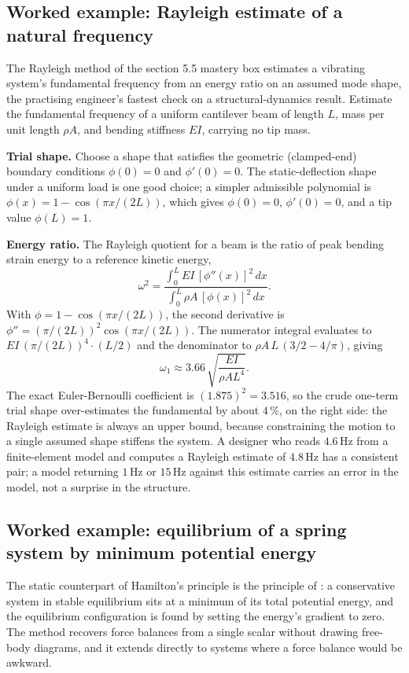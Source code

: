 \subsection{Worked example: Rayleigh estimate of a natural frequency}

The Rayleigh method of the section 5.5 mastery box estimates a vibrating
system's fundamental frequency from an energy ratio on an assumed mode
shape, the practising engineer's fastest check on a
structural-dynamics result. Estimate the
fundamental frequency of a uniform cantilever beam of length $L$, mass
per unit length $\rho A$, and bending stiffness $EI$, carrying no tip
mass.

\textbf{Trial shape.} Choose a shape that satisfies the geometric
(clamped-end) boundary conditions $\phi(0) = 0$ and $\phi'(0) = 0$. The
static-deflection shape under a uniform load is one good choice; a
simpler admissible polynomial is $\phi(x) = 1 - \cos(\pi x / (2L))$,
which gives $\phi(0) = 0$, $\phi'(0) = 0$, and a tip value $\phi(L) = 1$.

\textbf{Energy ratio.} The Rayleigh quotient for a beam is the ratio of
peak bending strain energy to a reference kinetic energy,
\[
\omega^2 = \frac{\displaystyle\int_0^L EI\,[\phi''(x)]^2\,dx}
                {\displaystyle\int_0^L \rho A\,[\phi(x)]^2\,dx}.
\]
With $\phi = 1 - \cos(\pi x/(2L))$, the second derivative is $\phi'' =
(\pi/(2L))^2\cos(\pi x/(2L))$. The numerator integral evaluates to
$EI\,(\pi/(2L))^4 \cdot (L/2)$ and the denominator to $\rho A\,L\,(3/2 -
4/\pi)$, giving
\[
\omega_1 \approx 3.66\,\sqrt{\frac{EI}{\rho A L^4}}.
\]
The exact Euler-Bernoulli coefficient is $(1.875)^2 = 3.516$, so the
crude one-term trial shape over-estimates the fundamental by about
$4\,\%$, on the right side: the Rayleigh estimate is always an
upper bound, because constraining the motion to a single assumed shape
stiffens the system. A designer who reads $4.6\,\si{\hertz}$ from a
finite-element model and computes a Rayleigh estimate of $4.8\,\si{\hertz}$
has a consistent pair; a model returning $1\,\si{\hertz}$ or
$15\,\si{\hertz}$ against this estimate carries an error in the model, not
a surprise in the structure.

\subsection{Worked example: equilibrium of a spring system by minimum
potential energy}

The static counterpart of Hamilton's principle is the principle of
: a conservative system in stable
equilibrium sits at a minimum of its total potential energy, and the
equilibrium configuration is found by setting the energy's gradient to
zero. The method recovers force balances from a single scalar without
drawing free-body diagrams, and it extends directly to systems where a
force balance would be awkward.

